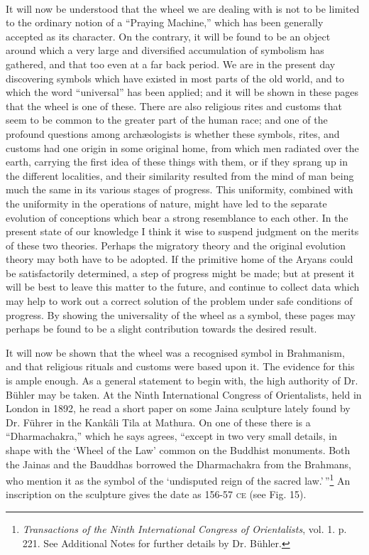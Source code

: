\documentclass[a4paper, 11pt, oneside, polutonikogreek, english]{article}
\begin{document}
\paragraph{}
It will now be understood that the wheel we are dealing with is not to be limited to the ordinary notion of a ``Praying Machine,'' which has been generally accepted as its character. On the contrary, it will be found to be an object around which a very large and diversified accumulation of symbolism has gathered, and that too even at a far back period. We are in the present day discovering symbols which have existed in most parts of the old world, and to which the word ``universal'' has been applied; and it will be shown in these pages that the wheel is one of these. There are also religious rites and customs that seem to be common to the greater part of the human race; and one of the profound questions among archæologists is whether these symbols, rites, and customs had one origin in some original home, from which men radiated over the earth, carrying the first idea of these things with them, or if they sprang up in the different localities, and their similarity resulted from the mind of man being much the same in its various stages of progress. This uniformity, combined with the uniformity in the operations of nature, might have led to the separate evolution of conceptions which bear a strong resemblance to each other. In the present state of our knowledge I think it wise to suspend judgment on the merits of these two theories. Perhaps the migratory theory and the original evolution theory may both have to be adopted. If the primitive home of the Aryans could be satisfactorily determined, a step of progress might be made; but at present it will be best to leave this matter to the future, and continue to collect data which may help to work out a correct solution of the problem under safe conditions of progress. By showing the universality of the wheel as a symbol, these pages may perhaps be found to be a slight contribution towards the desired result.

It will now be shown that the wheel was a recognised symbol in Brahmanism, and that religious rituals and customs were based upon it. The evidence for this is ample enough. As a general statement to begin with, the high authority of Dr. Bühler may be taken. At the Ninth International Congress of Orientalists, held in London in 1892, he read a short paper on some Jaina sculpture lately found by Dr. Führer in the Kankâli Tila at Mathura. On one of these there is a ``Dharmachakra,'' which he says agrees, ``except in two very small details, in shape with the `Wheel of the Law' common on the Buddhist monuments. Both the Jainas and the Bauddhas borrowed the Dharmachakra from the Brahmans, who mention it as the symbol of the `undisputed reign of the sacred law.'\,''\footnote{\emph{Transactions of the Ninth International Congress of Orientalists}, vol. 1. p. 221. See Additional Notes for further details by Dr. Bühler.} An inscription on the sculpture gives the date as 156-57 \textsc{ce} (see Fig. 15).
\end{document}
